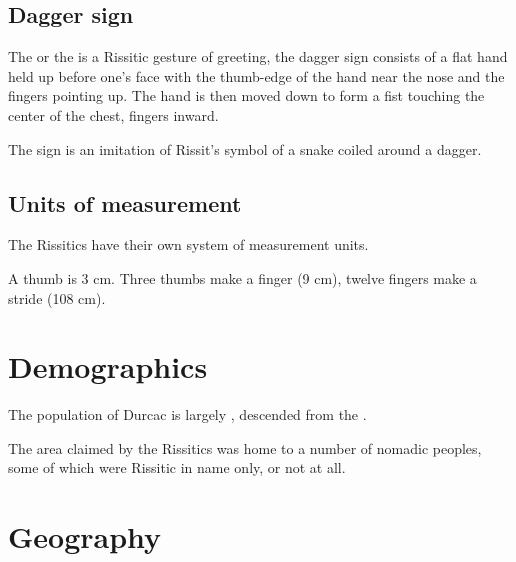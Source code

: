 \subsection{Dagger sign}
The  or the  is a Rissitic gesture of greeting, the dagger sign consists of a flat hand held up before one's face with the thumb-edge of the hand near the nose and the fingers pointing up. The hand is then moved down to form a fist touching the center of the chest, fingers inward. 

The sign is an imitation of Rissit's symbol of a snake coiled around a dagger. 






\subsection{Units of measurement}
The Rissitics have their own system of measurement units. 

A thumb is 3 cm. Three thumbs make a finger (9 cm), twelve fingers make a stride (108 cm).















\section{Demographics}

The \scathaese{} population of Durcac is largely , descended from the . 

The area claimed by the Rissitics was home to a number of nomadic peoples, some of which were Rissitic in name only, or not at all. 















\section{Geography}





